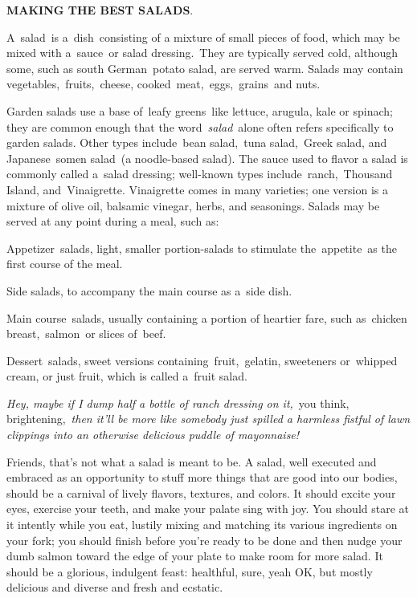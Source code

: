 \documentclass[11pt]{article}
\author{Rup}
\title{}
\begin{document}
\begin{center}
\textbf{MAKING THE BEST SALADS}.
\end{center}

{\raggedright
A~salad~is a~dish~consisting of a mixture of small pieces of food, which may be
mixed with a~sauce~or salad dressing.~They are typically served cold, although
some, such as south German~potato salad, are served warm. Salads may contain
vegetables,~fruits,~cheese, cooked~meat,~eggs,~grains~and nuts.
}

{\raggedright
Garden salads use a base of~leafy greens~like lettuce, arugula, kale or spinach;
they are common enough that the word~\textit{salad}~alone often refers
specifically to garden salads. Other types include~bean salad,~tuna salad,~Greek
salad, and Japanese~somen salad~(a noodle-based salad). The sauce used to flavor
a salad is commonly called a~salad dressing; well-known types
include~ranch,~Thousand Island, and~Vinaigrette. Vinaigrette comes in many
varieties; one version is a mixture of olive oil, balsamic vinegar, herbs, and
seasonings. Salads may be served at any point during a meal, such as:
}

{\raggedright
Appetizer~salads, light, smaller portion-salads to stimulate the~appetite~as the
first course of the meal.
}

{\raggedright
Side salads, to accompany the main course as a~side dish.
}

{\raggedright
Main course~salads, usually containing a portion of heartier fare, such
as~chicken breast,~salmon~or slices of~beef.
}

{\raggedright
Dessert~salads, sweet versions containing~fruit,~gelatin, sweeteners or~whipped
cream, or just fruit, which is called a~fruit salad.
}

{\raggedright
\textit{Hey, maybe if I dump half a bottle of ranch dressing on it,}~you think,
brightening,~\textit{then it'll be more like somebody just spilled a harmless
fistful of lawn clippings into an otherwise delicious puddle of mayonnaise!}
}

{\raggedright
Friends, that's not what a salad is meant to be. A salad, well executed and
embraced as an opportunity to stuff more things that are good into our bodies,
should be a carnival of lively flavors, textures, and colors. It should excite
your eyes, exercise your teeth, and make your palate sing with joy. You should
stare at it intently while you eat, lustily mixing and matching its various
ingredients on your fork; you should finish before you're ready to be done and
then nudge your dumb salmon toward the edge of your plate to make room for more
salad. It should be a glorious, indulgent feast: healthful, sure, yeah OK, but
mostly delicious and diverse and fresh and ecstatic.
}
\end{document}
